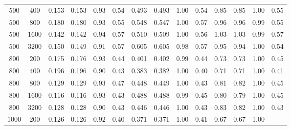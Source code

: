 \begin{table}[H]
{\begin{tabular}{ccccclccclcccl|}
$500$                        & \multicolumn{1}{c|}{$400$
}   &      0.153&    0.153&      0.93& \multicolumn{1}{l|}{0.54}    &      0.493&    0.493&      1.00& \multicolumn{1}{l|}{0.54}    &        0.85&      0.85&       1.00&      0.55\\
$500$                        & \multicolumn{1}{c|}{$800$
}   &      0.180&    0.180&      0.93& \multicolumn{1}{l|}{0.55}    &      0.548&    0.547&      1.00& \multicolumn{1}{l|}{0.57}    &        0.96&      0.96&       0.99&      0.55\\
$500$                        & \multicolumn{1}{c|}{$1600$
}  &      0.142&    0.142&      0.94& \multicolumn{1}{l|}{0.57}    &      0.510&    0.509&      1.00& \multicolumn{1}{l|}{0.56}    &        1.03&      1.03&       0.99&      0.57\\
$500$                        & \multicolumn{1}{c|}{$3200$
}  &      0.150&    0.149&      0.91& \multicolumn{1}{l|}{0.57}    &      0.605&    0.605&      0.98& \multicolumn{1}{l|}{0.57}    &        0.95&      0.94&       1.00&      0.54\\ \hline
$800$                        & \multicolumn{1}{c|}{$200$
}   &      0.175&    0.176&      0.93& \multicolumn{1}{l|}{0.44}    &      0.401&    0.402&      0.99& \multicolumn{1}{l|}{0.44}    &        0.73&      0.73&       1.00&      0.45\\
$800$                        & \multicolumn{1}{c|}{$400$
}   &      0.196&    0.196&      0.90& \multicolumn{1}{l|}{0.43}    &      0.383&    0.382&      1.00& \multicolumn{1}{l|}{0.40}    &        0.71&      0.71&       1.00&      0.41\\
$800$                        & \multicolumn{1}{c|}{$800$
}   &      0.129&    0.129&      0.93& \multicolumn{1}{l|}{0.47}    &      0.448&    0.449&      1.00& \multicolumn{1}{l|}{0.43}    &        0.81&      0.82&       1.00&      0.45\\
$800$                        & \multicolumn{1}{c|}{$1600$
}  &      0.116&    0.116&      0.93& \multicolumn{1}{l|}{0.43}    &      0.488&    0.488&      0.99& \multicolumn{1}{l|}{0.45}    &        0.80&      0.79&       1.00&      0.45\\
$800$                        & \multicolumn{1}{c|}{$3200$
}  &      0.128&    0.128&      0.90& \multicolumn{1}{l|}{0.43}    &      0.446&    0.446&      1.00& \multicolumn{1}{l|}{0.43}    &        0.83&      0.82&       1.00&      0.43\\ \hline
$1000$                       & \multicolumn{1}{c|}{$200$
}   &      0.126&    0.126&      0.92& \multicolumn{1}{l|}{0.40}    &      0.371&    0.371&      1.00& \multicolumn{1}{l|}{0.41}    &        0.67&      0.67&       1.00

\end{tabular}}
\end{table}

